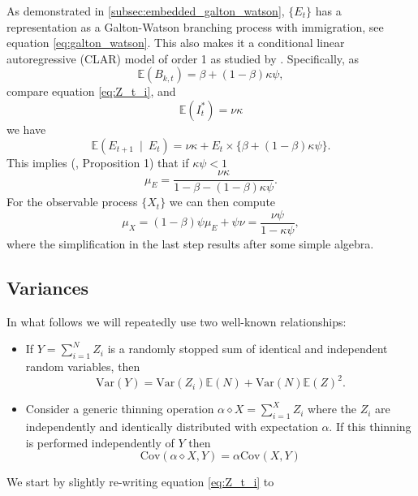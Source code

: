 \documentclass{article}
\begin{document}
As demonstrated in \ref{subsec:embedded_galton_watson}, $\{E_t\}$ has a representation as a Galton-Watson branching process with immigration, see equation \ref{eq:galton_watson}. This also makes it a conditional linear autoregressive (CLAR) model of order 1 as studied by \cite{Grunwald2000}. Specifically, as
$$
\mathbb{E}(B_{k, t}) = \beta + (1 - \beta)\kappa\psi,
$$
compare equation \eqref{eq:Z_t_i}, and
$$
\mathbb{E}(I^*_t) = \nu\kappa
$$
we have
$$
\mathbb{E}(E_{t + 1} \ \mid \ E_t) = \nu\kappa + E_t \times \{\beta + (1 - \beta)\kappa\psi\}.
$$
This implies (\cite{Grunwald2000}, Proposition 1) that if $\kappa \psi < 1$
$$
\mu_E = \frac{\nu\kappa}{1 - \beta - (1 - \beta)\kappa\psi}.
$$
For the observable process $\{X_t\}$ we can then compute
\begin{equation}
\mu_X = (1 - \beta)\psi\mu_E + \psi \nu = \frac{\nu\psi}{1 - \kappa\psi},\label{eq:CLAR}
\end{equation}
where the simplification in the last step results after some simple algebra.

\subsection{Variances}

In what follows we will repeatedly use two well-known relationships:
\begin{itemize}
\item If $Y = \sum_{i = 1}^N Z_i$ is a randomly stopped sum of identical and independent random variables, then
\begin{equation}
\text{Var}(Y) = \text{Var}(Z_i)\mathbb{E}(N) +  \text{Var}(N)\mathbb{E}(Z)^2.\label{eq:variance_rss}
\end{equation}
\item Consider a generic thinning operation $\alpha \diamond X = \sum_{i = 1}^X Z_i$ where the $Z_i$ are independently and identically distributed with expectation $\alpha$. If this thinning is performed independently of $Y$ then
\begin{equation}
\text{Cov}(\alpha \diamond X, Y) = \alpha \text{Cov}(X, Y)\label{eq:multiplication_independence}
\end{equation}
\end{itemize}


We start by slightly re-writing equation \eqref{eq:Z_t_i} to
\end{document}
